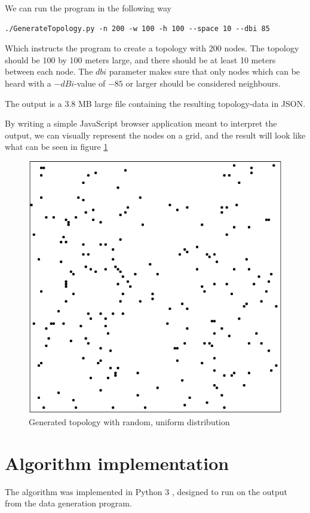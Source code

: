 \documentclass[a4paper,UKenglish]{report}
\begin{document}
We can run the program in the following way
\begin{verbatim}./GenerateTopology.py -n 200 -w 100 -h 100 --space 10 --dbi 85 \end{verbatim}
Which instructs the program to create a topology with 200 nodes. 
The topology should be 100 by 100 meters large, and there should be at least 10 meters
between each node. The $dbi$ parameter makes sure that only nodes which can be
heard with a $-dBi$-value of $-85$ or larger should be considered neighbours.

The output is a 3.8 MB large file containing the resulting topology-data in JSON.

By writing a simple JavaScript browser application meant to interpret the output, we can
visually represent the nodes on a grid, and the result will look like what can be seen in figure \ref{fig:randtop}

\begin{figure}
	\center
	\includegraphics[scale=0.4]{Images/randomtopology.png}
	\caption{Generated topology with random, uniform distribution}
	\label{fig:randtop}
\end{figure}

\section{Algorithm implementation}
The algorithm was implemented in Python 3 \cite{Python3}, designed to run on the output from 
the data generation program.
\end{document}
